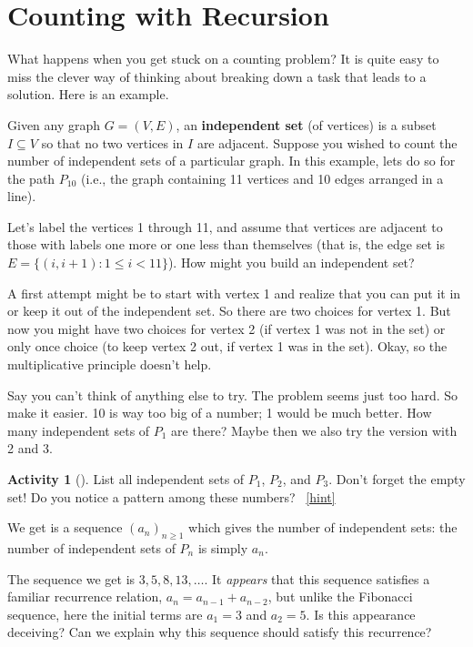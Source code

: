 \documentclass[10pt,]{book}
\newcommand{\terminology}[1]{\textbf{#1}}
\theoremstyle{plain}
\theoremstyle{definition}
\theoremstyle{definition}
\theoremstyle{definition}
\newtheorem{activity}[project]{Activity}
\numberwithin{equation}{chapter}
\def\st{:}
\newcommand{\lt}{<}
\begin{document}
\section[{Counting with Recursion}]{Counting with Recursion}\label{sec_basic-recursion}
\hypertarget{p-448}{}%
What happens when you get stuck on a counting problem?  It is quite easy to miss the clever way of thinking about breaking down a task that leads to a solution.  Here is an example.%
\par
\hypertarget{p-449}{}%
Given any graph \(G = (V, E)\), an \terminology{independent set} (of vertices) is a subset \(I \subseteq V\) so that no two vertices in \(I\) are adjacent.  Suppose you wished to count the number of independent sets of a particular graph.  In this example, lets do so for the path \(P_{10}\) (i.e., the graph containing 11 vertices and 10 edges arranged in a line).%
\par
\hypertarget{p-450}{}%
Let's label the vertices 1 through 11, and assume that vertices are adjacent to those with labels one more or one less than themselves (that is, the edge set is \(E = \{(i,i+1) \st 1 \le i \lt 11\}\)).  How might you build an independent set?%
\par
\hypertarget{p-451}{}%
A first attempt might be to start with vertex 1 and realize that you can put it in or keep it out of the independent set.  So there are two choices for vertex 1.  But now you might have two choices for vertex 2 (if vertex 1 was not in the set) or only once choice (to keep vertex 2 out, if vertex 1 was in the set).  Okay, so the multiplicative principle doesn't help.%
\par
\hypertarget{p-452}{}%
Say you can't think of anything else to try.  The problem seems just too hard.  So make it easier.  10 is way too big of a number; 1 would be much better.  How many independent sets of \(P_1\) are there?  Maybe then we also try the version with 2 and 3.%
\begin{activity}[]\label{activity-70}
\hypertarget{p-453}{}%
List all independent sets of \(P_1\), \(P_2\), and \(P_3\).  Don't forget the empty set! Do you notice a pattern among these numbers?%
~\hfill{\tiny\hyperlink{a-70}{[hint]}\hypertarget{q-70}{}}\end{activity}
\hypertarget{p-455}{}%
We get is a sequence \((a_n)_{n \ge 1}\) which gives the number of independent sets: the number of independent sets of \(P_n\) is simply \(a_n\).%
\par
\hypertarget{p-456}{}%
The sequence we get is \(3, 5, 8, 13, \ldots\).  It \emph{appears} that this sequence satisfies a familiar recurrence relation, \(a_n = a_{n-1} + a_{n-2}\), but unlike the Fibonacci sequence, here the initial terms are \(a_1 = 3\) and \(a_2 = 5\).  Is this appearance deceiving?  Can we explain why this sequence should satisfy this recurrence?%
\end{document}
